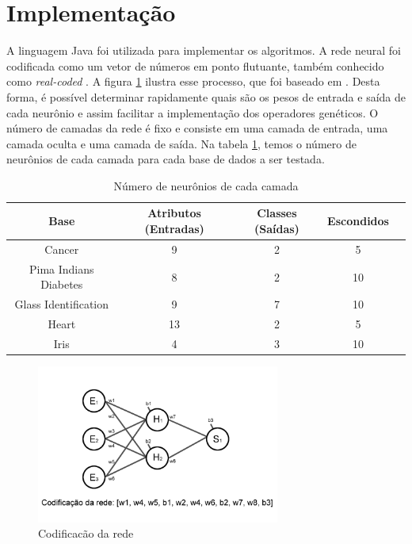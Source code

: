 \documentclass[12pt]{article}
\begin{document}
\section{Implementação}\label{sec:imple}

\par A linguagem Java foi utilizada para implementar os algoritmos. A rede neural foi codificada como um vetor de números em ponto flutuante, também conhecido como \textit{real-coded} \cite{Liu}. A figura \ref{fig:nn} ilustra esse processo, que foi baseado em \cite{montana}. Desta forma, é possível determinar rapidamente quais são os pesos de entrada e saída de cada neurônio e assim facilitar a implementação dos o\-pe\-ra\-do\-res genéticos. O número de camadas da rede é fixo e consiste em uma camada de entrada, uma camada oculta e uma camada de saída. Na tabela \ref{tab:params}, temos o número de neurônios de cada camada para cada base de dados a ser testada.

\begin{table}[h]
	\center
	\begin{tabular}{|c|c|c|c|c|}
		\hline Base  & Atributos (Entradas) & Classes (Saídas) & Escondidos \\ 
		\hline Cancer & 9 & 2 & 5 \\ 
		\hline Pima Indians Diabetes & 8 & 2 & 10 \\ 
		\hline Glass Identification & 9 & 7 & 10 \\ 
		\hline Heart & 13 & 2 & 5 \\ 
		\hline Iris & 4 & 3 & 10 \\ 
		\hline 
	\end{tabular}
	\caption{Número de neurônios de cada camada}
	\label{tab:params}
\end{table} 

\begin{figure}[ht]
\centering
\includegraphics[width=80mm]{codificacao.png}
\caption{Codificacão da rede}
\label{fig:nn}
\end{figure}
\end{document}
